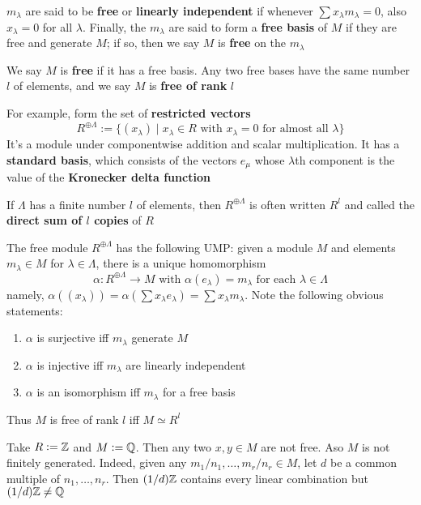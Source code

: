 \documentclass[11pt]{article}
\begin{document}
\(m_\lambda\) are said to be \textbf{free} or \textbf{linearly independent} if whenever \(\sum
   x_\lambda m_\lambda=0\), also \(x_\lambda=0\) for all \(\lambda\). Finally, the
\(m_\lambda\) are said to form a \textbf{free basis} of \(M\) if they are free and
generate \(M\); if so, then we say \(M\) is \textbf{free} on the \(m_\lambda\)

We say \(M\) is \textbf{free} if it has a free basis. Any two free bases have the same
number \(l\) of elements, and we say \(M\) is \textbf{free of rank} \(l\)

For example, form the set of \textbf{restricted vectors}
\begin{equation*}
R^{\oplus\Lambda}:=\{(x_\lambda)\mid x_\lambda\in R\text{ with }x_\lambda=0
\text{ for almost all }\lambda\}
\end{equation*}
It's a module under componentwise addition and scalar multiplication. It has
a \textbf{standard basis}, which consists of the vectors \(e_\mu\) whose \(\lambda\)th
component is the value of the \textbf{Kronecker delta function}

If \(\Lambda\) has a finite number \(l\) of elements, then \(R^{\oplus\Lambda}\) is
often written \(R^l\) and called the \textbf{direct sum of \(l\) copies} of \(R\)

The free module \(R^{\oplus\Lambda}\) has the following UMP: given a module
\(M\) and elements \(m_\lambda\in M\) for \(\lambda\in\Lambda\), there is a
unique homomorphism
\begin{equation*}
\alpha:R^{\oplus\Lambda}\to M\text{ with }\alpha(e_\lambda)=m_\lambda
\text{ for each }\lambda\in\Lambda
\end{equation*}
namely, \(\alpha((x_\lambda))=\alpha(\sum x_\lambda e_\lambda)=\sum x_\lambda
   m_\lambda\). Note the following obvious statements:
\begin{enumerate}
\item \(\alpha\) is surjective iff \(m_\lambda\) generate \(M\)
\item \(\alpha\) is injective iff \(m_\lambda\) are linearly independent
\item \(\alpha\) is an isomorphism iff \(m_\lambda\) for a free basis
\end{enumerate}


Thus \(M\) is free of rank \(l\) iff \(M\simeq R^l\)

\begin{exercise}
\label{4.11}
Take \(R:=\mathbb{Z}\) and \(M:=\mathbb{Q}\). Then any two \(x,y\in M\) are not free. Aso \(M\)
is not finitely generated. Indeed, given any \(m_1/n_1,\dots,m_r/n_r\in M\),
let \(d\) be a common multiple of \(n_1,\dots,n_r\). Then \((1/d)\mathbb{Z}\)
contains every linear combination but \((1/d)\mathbb{Z}\neq\mathbb{Q}\)
\end{exercise}
\end{document}
